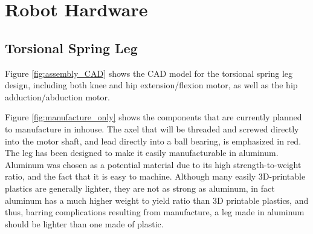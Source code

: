 \section{Robot Hardware}
\label{sec:robot_hardware}

\subsection{Torsional Spring Leg}
\label{sec:torsional_spring_leg}

Figure \ref{fig:assembly_CAD} shows the CAD model for the torsional spring leg design, including both knee and hip extension/flexion motor, as well as the hip adduction/abduction motor. 

Figure \ref{fig:manufacture_only} shows the components that are currently planned to manufacture in inhouse. The axel that will be threaded and screwed directly into the motor shaft, and lead directly into a ball bearing, is emphasized in red. The leg has been designed to make it easily manufacturable in aluminum. Aluminum was chosen as a potential material due to its high strength-to-weight ratio, and the fact that it is easy to machine. Although many easily 3D-printable plastics are generally lighter, they are not as strong as aluminum, in fact aluminum has a much higher weight to yield ratio than 3D printable plastics, and thus, barring complications resulting from manufacture, a leg made in aluminum should be lighter than one made of plastic. 

